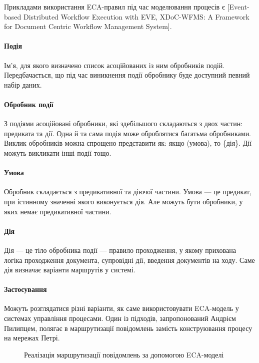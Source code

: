 \documentclass{memoir}
\begin{document}
Прикладами використання ECA-правил під час моделювання процесів є [Event-based Distributed Workflow Execution with EVE, XDoC-WFMS: A Framework for Document Centric Workflow Management System].

\paragraph{Подія}

Ім’я, для якого визначено список асоційованих із ним обробників подій. Передбачається, що під час виникнення події обробнику буде доступний певний набір даних.

\paragraph{Обробник події}

З подіями асоційовані обробники, які здебільшого складаються з двох частин: предиката та дії. Одна й та сама подія може оброблятися багатьма обробниками. Виклик обробників можна спрощено представити як: якщо (умова), то \{дія\}. Дії можуть викликати інші події тощо.

\paragraph{Умова}

Обробник складається з предикативної та діючої частини. Умова — це предикат, при істинному значенні якого виконується дія. Але можуть бути обробники, у яких немає предикативної частини.

\paragraph{Дія}

Дія — це тіло обробника події — правило проходження, у якому прихована логіка проходження документа, супровідні дії, введення документів на ходу. Саме дія визначає варіанти маршрутів у системі.

\paragraph{Застосування}

Можуть розглядатися різні варіанти, як саме використовувати ECA-модель у системах управління процесами. Один із підходів, запропонований Андрієм Пилипцем, полягає в маршрутизації повідомлень замість конструювання процесу на мережах Петрі.

\begin{figure}[h]
    \centering
    \caption{Реалізація маршрутизації повідомлень за допомогою ECA-моделі}
    \label{fig:eca_routing}
\end{figure}
\end{document}
